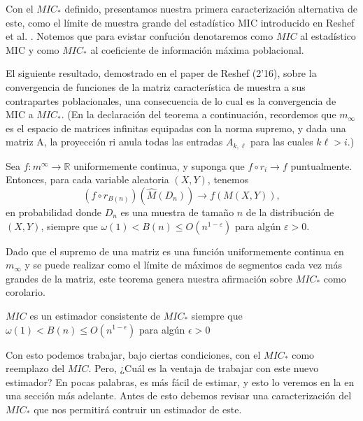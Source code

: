         Con el $MIC_*$ definido, presentamos nuestra primera caracterizaci\'on alternativa de este, como el l\'imite de muestra grande del estad\'istico MIC introducido en Reshef et al. \cite{Reshef2011}. Notemos que para evistar confuci\'on denotaremos como $MIC$ al estad\'istico MIC y como $MIC_*$ al coeficiente de informaci\'on m\'axima poblacional.
    
        El siguiente resultado, demostrado en el paper de Reshef (2'16)\cite{Reshef2016}, sobre la convergencia de funciones de la matriz caracter\'istica de muestra a sus contrapartes poblacionales, una consecuencia de lo cual es la convergencia de MIC a $MIC_*$. (En la declaraci\'on del teorema a continuaci\'on, recordemos que $m_\infty$ es el espacio de matrices infinitas equipadas con la norma supremo, y dada una matriz A, la proyecci\'on ri anula todas las entradas $A_{k, \ell}$ para las cuales $k\ell > i.$)
    
        \begin{thm}
            Sea $f: m^{\infty} \rightarrow \mathbb{R}$ uniformemente continua, y suponga que $f \circ r_i \rightarrow f$ puntualmente. Entonces, para cada variable aleatoria $(X, Y)$, tenemos
            $$
            \left(f \circ r_{B(n)}\right)\left(\widehat{M}\left(D_n\right)\right) \rightarrow f(M(X, Y)),
            $$
            en probabilidad donde $D_n$ es una muestra de tama\~no $n$ de la distribuci\'on de $(X, Y)$, siempre que $\omega(1)<B(n) \leq O\left(n^{1-\varepsilon}\right)$ para alg\'un $\varepsilon>0$.
        \end{thm}
    
        Dado que el supremo de una matriz es una funci\'on uniformemente continua en $m_\infty$ y se puede realizar como el l\'imite de m\'aximos de segmentos cada vez m\'as grandes de la matriz, este teorema genera nuestra afirmaci\'on sobre $MIC_*$ como corolario.
    
        \begin{cor}
            $MIC$ es un estimador consistente de $MIC_*$ siempre que $\omega(1) < B(n) \leq O(n^{1-\epsilon})$ para alg\'un $\epsilon > 0$
        \end{cor}
    
        Con esto podemos trabajar, bajo ciertas condiciones, con el $MIC_*$ como reemplazo del $MIC$. Pero, ¿Cu\'al es la ventaja de trabajar con este nuevo estimador? En pocas palabras, es m\'as f\'acil de estimar, y esto lo veremos en la en una secci\'on m\'as adelante. Antes de esto debemos revisar una caracterizaci\'on del $MIC_*$ que nos permitir\'a contruir un estimador de este.
    
